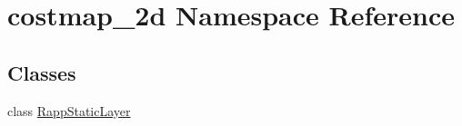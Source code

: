 \hypertarget{namespacecostmap__2d}{\section{costmap\-\_\-2d Namespace Reference}
\label{namespacecostmap__2d}
}
\subsection*{Classes}
\begin{DoxyCompactItemize}
\item 
class \hyperlink{classcostmap__2d_1_1RappStaticLayer}{Rapp\-Static\-Layer}
\end{DoxyCompactItemize}
